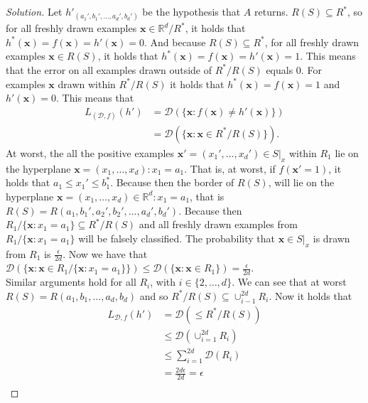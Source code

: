 \documentclass[10pt, a4paper, twoside]{amsart}
\newcommand{\R}{\ensuremath{\mathbb{R}}}
\newenvironment{solution}
               {\let\oldqedsymbol=\qedsymbol
                \renewcommand{\qedsymbol}{$\blacktriangleleft$}
                \begin{proof}[Solution]}
               {\end{proof}
                \renewcommand{\qedsymbol}{\oldqedsymbol}}
\begin{document}
\begin{solution}
    Let $h'_{(a_1',b_1',\ldots,a_d',b_d')}$ be the hypothesis that $A$ returns. $R(S)\subseteq R^*$, so for all freshly drawn examples $\mathbf{x} \in \R^d/R^*$,  it holds that $h^*(\mathbf{x})=f(\mathbf{x}) = h'(\mathbf{x}) = 0$. And because $R(S)\subseteq R^*$, for all freshly drawn examples $\mathbf{x} \in R(S)$, it holds that $h^*(\mathbf{x})=f(\mathbf{x}) = h'(\mathbf{x}) = 1$. This means that the error on all examples drawn outside of $R^*/R(S)$ equals $0$. For examples $\mathbf{x}$ drawn within $R^*/R(S)$ it holds that $h^*(\mathbf{x})=f(\mathbf{x}) = 1$ and $h'(\mathbf{x}) = 0$. This means that 
    \begin{align*}
    L_{(\mathcal{D},f)}(h') &= \mathcal{D}(\{\mathbf{x}: f(\mathbf{x}) \neq h'(\mathbf{x})\}) \\ 
    &= \mathcal{D}(\{\mathbf{x}:\mathbf{x}\in R^*/R(S)\}).
    \end{align*}
  At worst, the all the positive examples $\mathbf{x'} = (x_1',\ldots,x_d') \in S|_x$ within $R_1$ lie on the hyperplane $\mathbf{x}=(x_1,\ldots,x_d):x_1 = a_1$. That is, at worst, if $f(\mathbf{x'} = 1)$, it holds that $a_1\leq x_1' \leq b_1^*$. Because then the border of $R(S)$, will lie on the hyperplane $\mathbf{x} = (x_1,\ldots,x_d) \in \R^d: x_1 = a_1$, that is $R(S) = R(a_1,b_1',a_2',b_2',\ldots, a_d',b_d')$. Because then $R_{1}/\{\mathbf{x}:x_1=a_1\} \subseteq R^*/R(S)$ and all freshly drawn examples from $R_{1}/\{\mathbf{x}:x_1=a_1\}$ will be falsely classified. The probability that $\mathbf{x} \in S|_x$ is drawn from $R_1$ is $\frac{\epsilon}{2d}$. Now we have that $\mathcal{D}(\{\mathbf{x}: \mathbf{x} \in R_{1}/\{\mathbf{x}:x_1=a_1\}\}) \leq \mathcal{D}(\{\mathbf{x}: \mathbf{x} \in R_{1}\}) = \frac{\epsilon}{2d}$.\\
  Similar arguments hold for all $R_i$, with $i \in \{2, \ldots ,d\}$. We can see that at worst $R(S) = R(a_1,b_1,\ldots,a_d,b_d)$ and so $R^*/R(S) \subseteq \cup_{i-1}^{2d} R_i$. Now it holds that
\begin{align*}
  L_{\mathcal{D},f}(h') & = \mathcal{D}(\leq R^*/R(S)) \\
                      & \leq \mathcal{D}(\cup_{i=1}^{2d} R_i) \\
                      & \leq \sum_{i=1}^{2d} \mathcal{D}(R_i)\\
 & = \frac{2d\epsilon}{2d} = \epsilon \\
\end{align*}
\end{solution}
\end{document}
